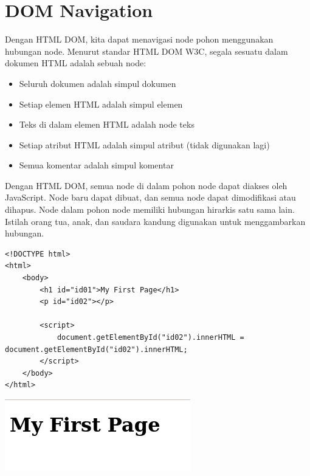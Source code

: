 \documentclass[a4paper,12pt]{article}
\begin{document}
\section*{DOM Navigation}
Dengan HTML DOM, kita dapat menavigasi node pohon menggunakan hubungan node. Menurut standar HTML DOM W3C, segala sesuatu dalam dokumen HTML adalah sebuah node:
\begin{itemize}
    \item Seluruh dokumen adalah simpul dokumen
    \item Setiap elemen HTML adalah simpul elemen
    \item Teks di dalam elemen HTML adalah node teks
    \item Setiap atribut HTML adalah simpul atribut (tidak digunakan lagi)
    \item Semua komentar adalah simpul komentar
\end{itemize}
Dengan HTML DOM, semua node di dalam pohon node dapat diakses oleh JavaScript. Node baru dapat dibuat, dan semua node dapat dimodifikasi atau dihapus. Node dalam pohon node memiliki hubungan hirarkis satu sama lain. Istilah orang tua, anak, dan saudara kandung digunakan untuk menggambarkan hubungan.
\begin{lstlisting}
<!DOCTYPE html>
<html>
    <body>
        <h1 id="id01">My First Page</h1>
        <p id="id02"></p>

        <script>
            document.getElementById("id02").innerHTML = document.getElementById("id02").innerHTML;
        </script>
    </body>
</html>
\end{lstlisting}

\begin{center}
    \includegraphics[scale=.7]{7.png} 
\end{center}
\end{document}
